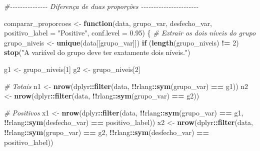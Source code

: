 \documentclass[
]{article}
\newenvironment{Shaded}{\begin{snugshade}}{\end{snugshade}}
\newcommand{\AttributeTok}[1]{\textcolor[rgb]{0.13,0.29,0.53}{#1}}
\newcommand{\CommentTok}[1]{\textcolor[rgb]{0.56,0.35,0.01}{\textit{#1}}}
\newcommand{\ControlFlowTok}[1]{\textcolor[rgb]{0.13,0.29,0.53}{\textbf{#1}}}
\newcommand{\DecValTok}[1]{\textcolor[rgb]{0.00,0.00,0.81}{#1}}
\newcommand{\FloatTok}[1]{\textcolor[rgb]{0.00,0.00,0.81}{#1}}
\newcommand{\FunctionTok}[1]{\textcolor[rgb]{0.13,0.29,0.53}{\textbf{#1}}}
\newcommand{\NormalTok}[1]{#1}
\newcommand{\OtherTok}[1]{\textcolor[rgb]{0.56,0.35,0.01}{#1}}
\newcommand{\SpecialCharTok}[1]{\textcolor[rgb]{0.81,0.36,0.00}{\textbf{#1}}}
\newcommand{\StringTok}[1]{\textcolor[rgb]{0.31,0.60,0.02}{#1}}
\begin{document}
\begin{Shaded}
\begin{Highlighting}[]
\CommentTok{\#{-}{-}{-}{-}{-}{-}{-}{-}{-}{-}{-}{-}{-}{-}{-} Diferença de duas proporções {-}{-}{-}{-}{-}{-}{-}{-}{-}{-}{-}{-}{-}{-}{-}{-}{-}{-}{-}{-}{-}{-}{-}}


\NormalTok{comparar\_proporcoes }\OtherTok{\textless{}{-}} \ControlFlowTok{function}\NormalTok{(data, grupo\_var, desfecho\_var, }\AttributeTok{positivo\_label =} \StringTok{"Positive"}\NormalTok{, }\AttributeTok{conf.level =} \FloatTok{0.95}\NormalTok{) \{}
  \CommentTok{\# Extrair os dois níveis do grupo}
\NormalTok{  grupo\_niveis }\OtherTok{\textless{}{-}} \FunctionTok{unique}\NormalTok{(data[[grupo\_var]])}
  \ControlFlowTok{if}\NormalTok{ (}\FunctionTok{length}\NormalTok{(grupo\_niveis) }\SpecialCharTok{!=} \DecValTok{2}\NormalTok{) }\FunctionTok{stop}\NormalTok{(}\StringTok{"A variável do grupo deve ter exatamente dois níveis."}\NormalTok{)}
  
\NormalTok{  g1 }\OtherTok{\textless{}{-}}\NormalTok{ grupo\_niveis[}\DecValTok{1}\NormalTok{]}
\NormalTok{  g2 }\OtherTok{\textless{}{-}}\NormalTok{ grupo\_niveis[}\DecValTok{2}\NormalTok{]}
  
  \CommentTok{\# Totais}
\NormalTok{  n1 }\OtherTok{\textless{}{-}} \FunctionTok{nrow}\NormalTok{(dplyr}\SpecialCharTok{::}\FunctionTok{filter}\NormalTok{(data, }\SpecialCharTok{!!}\NormalTok{rlang}\SpecialCharTok{::}\FunctionTok{sym}\NormalTok{(grupo\_var) }\SpecialCharTok{==}\NormalTok{ g1))}
\NormalTok{  n2 }\OtherTok{\textless{}{-}} \FunctionTok{nrow}\NormalTok{(dplyr}\SpecialCharTok{::}\FunctionTok{filter}\NormalTok{(data, }\SpecialCharTok{!!}\NormalTok{rlang}\SpecialCharTok{::}\FunctionTok{sym}\NormalTok{(grupo\_var) }\SpecialCharTok{==}\NormalTok{ g2))}
  
  \CommentTok{\# Positivos}
\NormalTok{  x1 }\OtherTok{\textless{}{-}} \FunctionTok{nrow}\NormalTok{(dplyr}\SpecialCharTok{::}\FunctionTok{filter}\NormalTok{(data, }\SpecialCharTok{!!}\NormalTok{rlang}\SpecialCharTok{::}\FunctionTok{sym}\NormalTok{(grupo\_var) }\SpecialCharTok{==}\NormalTok{ g1, }\SpecialCharTok{!!}\NormalTok{rlang}\SpecialCharTok{::}\FunctionTok{sym}\NormalTok{(desfecho\_var) }\SpecialCharTok{==}\NormalTok{ positivo\_label))}
\NormalTok{  x2 }\OtherTok{\textless{}{-}} \FunctionTok{nrow}\NormalTok{(dplyr}\SpecialCharTok{::}\FunctionTok{filter}\NormalTok{(data, }\SpecialCharTok{!!}\NormalTok{rlang}\SpecialCharTok{::}\FunctionTok{sym}\NormalTok{(grupo\_var) }\SpecialCharTok{==}\NormalTok{ g2, }\SpecialCharTok{!!}\NormalTok{rlang}\SpecialCharTok{::}\FunctionTok{sym}\NormalTok{(desfecho\_var) }\SpecialCharTok{==}\NormalTok{ positivo\_label))}
  

\end{Highlighting}
\end{Shaded}
\end{document}
